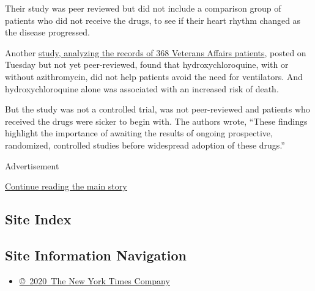 Their study was peer reviewed but did not include a comparison group of
patients who did not receive the drugs, to see if their heart rhythm
changed as the disease progressed.

Another
\href{https://www.medrxiv.org/content/10.1101/2020.04.16.20065920v1}{study,
analyzing the records of 368 Veterans Affairs patients}, posted on
Tuesday but not yet peer-reviewed, found that hydroxychloroquine, with
or without azithromycin, did not help patients avoid the need for
ventilators. And hydroxychloroquine alone was associated with an
increased risk of death.

But the study was not a controlled trial, was not peer-reviewed and
patients who received the drugs were sicker to begin with. The authors
wrote, ``These findings highlight the importance of awaiting the results
of ongoing prospective, randomized, controlled studies before widespread
adoption of these drugs.''

Advertisement

\protect\hyperlink{after-bottom}{Continue reading the main story}

\hypertarget{site-index}{%
\subsection{Site Index}\label{site-index}}

\hypertarget{site-information-navigation}{%
\subsection{Site Information
Navigation}\label{site-information-navigation}}

\begin{itemize}
\tightlist
\item
  \href{https://help.nytimes.com/hc/en-us/articles/115014792127-Copyright-notice}{©~2020~The
  New York Times Company}
\end{itemize}


